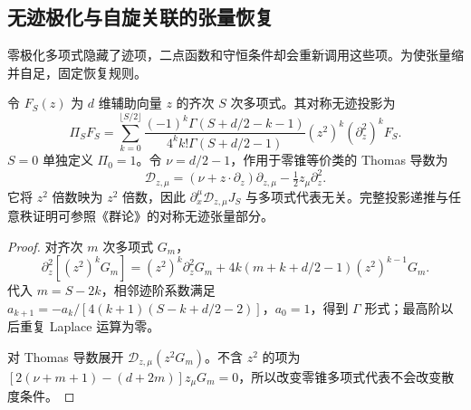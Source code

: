 \subsection{无迹极化与自旋关联的张量恢复}

零极化多项式隐藏了迹项，二点函数和守恒条件却会重新调用这些项。为使张量缩并自足，固定恢复规则。

\begin{definition}[调和投影与零锥导数]
令 $F_S(z)$ 为 $d$ 维辅助向量 $z$ 的齐次 $S$ 次多项式。其对称无迹投影为
\begin{equation}\label{eq:ghs-r4-stf-projector}
 \Pi_SF_S=\sum_{k=0}^{\lfloor S/2\rfloor}
 \frac{(-1)^k\Gamma(S+d/2-k-1)}{4^kk!\Gamma(S+d/2-1)}
 (z^2)^k(\partial_z^2)^kF_S.
\end{equation}
$S=0$ 单独定义 $\Pi_0=1$。令 $\nu=d/2-1$，作用于零锥等价类的 Thomas 导数为
\[
 \mathcal D_{z,\mu}=(\nu+z\cdot\partial_z)\partial_{z,\mu}
 -\tfrac12z_\mu\partial_z^2.
\]
它将 $z^2$ 倍数映为 $z^2$ 倍数，因此 $\partial_x^\mu\mathcal D_{z,\mu}J_S$ 与多项式代表无关。完整投影递推与任意秩证明可参照《群论》的对称无迹张量部分。
\end{definition}
\begin{proof}
对齐次 $m$ 次多项式 $G_m$，
\[
 \partial_z^2[(z^2)^kG_m]=(z^2)^k\partial_z^2G_m
 +4k(m+k+d/2-1)(z^2)^{k-1}G_m.
\]
代入 $m=S-2k$，相邻迹阶系数满足
$a_{k+1}=-a_k/[4(k+1)(S-k+d/2-2)]$，$a_0=1$，得到 $\Gamma$ 形式；最高阶以后重复 Laplace 运算为零。

对 Thomas 导数展开 $\mathcal D_{z,\mu}(z^2G_m)$。不含 $z^2$ 的项为
$[2(\nu+m+1)-(d+2m)]z_\mu G_m=0$，所以改变零锥多项式代表不会改变散度条件。
\end{proof}
